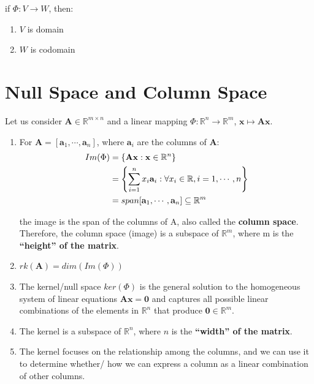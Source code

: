if $\Phi : V \to W$, then:
\begin{enumerate}
    \item $V$ is domain
    \item $W$ is codomain
\end{enumerate}


\section{Null Space and Column Space \cite{mfml-1}}\label{Null Space and Column Space}

Let us consider $\mathbf{A} \in \mathbb{R}^{m\times n}$ and a linear mapping $\Phi : \mathbb{R}^n \to \mathbb{R}^m$, $\mathbf{x} \mapsto \mathbf{Ax}$.

\begin{enumerate}
    \item For $\mathbf{A} = [\mathbf{a}_1, \cdots , \mathbf{a}_n]$, where $\mathbf{a}_i$ are the columns of $\mathbf{A}$:
    \[
    \begin{aligned}
        \displaystyle
        Im(\Phi) 
        &= \left\{ \mathbf{Ax} : \mathbf{x} \in \mathbb{R}^n \right\} \\
        &= \left\{ \sum_{i=1}^{n} x_i\mathbf{a}_i : \forall x_i \in \mathbb{R}, i=1,\cdots,n \right\} \\
        &= span[\mathbf{a}_1,\cdots, \mathbf{a}_n] \subseteq \mathbb{R}^m \\
    \end{aligned}
    \]

    the image is the span of the columns of A, also called the \textbf{column space}. Therefore, the column space (image) is a subspace of $\mathbb{R}^m$, where m is the \textbf{“height” of the matrix}.

    \item $rk(\mathbf{A}) = dim(Im(\Phi))$

    \item The kernel/null space $ker(\Phi)$ is the general solution to the homogeneous system of linear equations $\mathbf{Ax = 0}$ and captures all possible linear combinations of the elements in $\mathbb{R}^n$ that produce $\mathbf{0} \in \mathbb{R}^m$.

    \item The kernel is a subspace of $\mathbb{R}^n$, where $n$ is the \textbf{“width” of the matrix}.

    \item The kernel focuses on the relationship among the columns, and we can use it to determine whether/ how we can express a column as a linear combination of other columns.
\end{enumerate}



